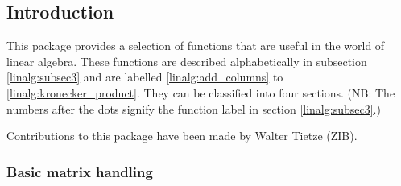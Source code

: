 
{                               %
\newcommand\exprlist  {expr$_{1}$,expr$_{2}$, \ldots ,expr$_{{\tt n}}$}
\newcommand\lineqlist {lin\_eqn$_{1}$,lin\_eqn$_{2}$, \ldots ,lin\_eqn$_{n}$}
\newcommand\matlist   {mat$_{1}$,mat$_{2}$, \ldots ,mat$_{n}$}
\newcommand\veclist   {vec$_{1}$,vec$_{2}$, \ldots ,vec$_{n}$}

\newcommand\lazyfootnote{\footnote{If you're feeling lazy then the \{\}'s can
                  be omitted.}}


\setcounter{secnumdepth}{3}


\subsection{Introduction}
\ifdefined{}\fi
This package provides a selection of functions that are useful in the world of
linear algebra. These functions are described alphabetically in subsection
\ref{linalg:subsec3} and are labelled \ref{linalg:add_columns} to
\ref{linalg:kronecker_product}.  They can be classified into four sections.  (NB:
The numbers after the dots signify the function label in section
\ref{linalg:subsec3}.)

Contributions to this package have been made by Walter Tietze (ZIB).

\subsubsection{Basic matrix handling}

}
